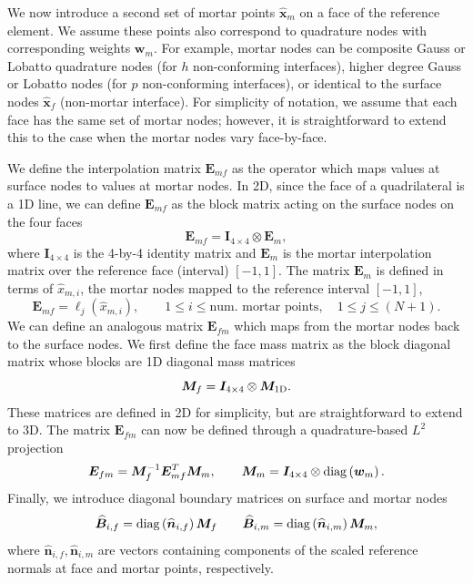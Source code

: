 \documentclass{svjour3}                     %
\renewcommand{\hat}{\widehat}
\newcommand{\diag}[1]{{\rm diag}\LRp{#1}}
\newcommand{\LRp}[1]{\left( #1 \right)}
\begin{document}
We now introduce a second set of mortar points $\hat{\bm{x}}_m$ on a face of the reference element.  We assume these points also correspond to quadrature nodes with corresponding weights $\bm{w}_m$.  For example, mortar nodes can be composite Gauss or Lobatto quadrature nodes (for $h$ non-conforming interfaces), higher degree Gauss or Lobatto nodes (for $p$ non-conforming interfaces), or identical to the surface nodes $\hat{\bm{x}}_f$ (non-mortar interface).   For simplicity of notation, we assume that each face has the same set of mortar nodes; however, it is straightforward to extend this to the case when the mortar nodes vary face-by-face.  

We define the interpolation matrix $\bm{E}_{mf}$ as the operator which maps values at surface nodes to values at mortar nodes.  In 2D, since the face of a quadrilateral is a 1D line, we can define $\bm{E}_{mf}$ as the block matrix acting on the surface nodes on the four faces 
\[
\bm{E}_{mf} = \bm{I}_{4\times 4}\otimes \bm{E}_m,
\]
where $\bm{I}_{4\times 4}$ is the 4-by-4 identity matrix and $\bm{E}_m$ is the mortar interpolation matrix over the reference face (interval) $[-1,1]$.  The matrix $\bm{E}_m$ is defined in terms of $\hat{x}_{m,i}$, the mortar nodes mapped to the reference interval $[-1,1]$,   
\[
\bm{E}_{mf} = \ell_j(\hat{x}_{m,i}), \qquad 1\leq i \leq \text{num.\ mortar points}, \quad 1\leq j \leq (N+1).
\]
We can define an analogous matrix $\bm{E}_{fm}$ which maps from the mortar nodes back to the surface nodes.  We first define the face mass matrix as the block diagonal matrix whose blocks are 1D diagonal mass matrices
\[
\bm{M}_f = \bm{I}_{4\times 4} \otimes \bm{M}_{\rm 1D}.
\]
These matrices are defined in 2D for simplicity, but are straightforward to extend to 3D.  
The matrix $\bm{E}_{fm}$ can now be defined through a quadrature-based $L^2$ projection 
\[
\bm{E}_{fm} = \bm{M}_f^{-1}\bm{E}_{mf}^T\bm{M}_m, \qquad \bm{M}_m = \bm{I}_{4\times 4}\otimes \diag{\bm{w}_m}.
\]
Finally, we introduce diagonal boundary matrices on surface and mortar nodes 
\begin{equation}
\hat{\bm{B}}_{i,f} = \diag{\hat{\bm{n}}_{i,f}}\bm{M}_f %
\qquad \hat{\bm{B}}_{i,m} = \diag{\hat{\bm{n}}_{i,m}}\bm{M}_m,%
\label{eq:Bi}
\end{equation}
where $\hat{\bm{n}}_{i,f}, \hat{\bm{n}}_{i,m}$ are vectors containing components of the scaled reference normals at face and mortar points, respectively.  

\end{document}
